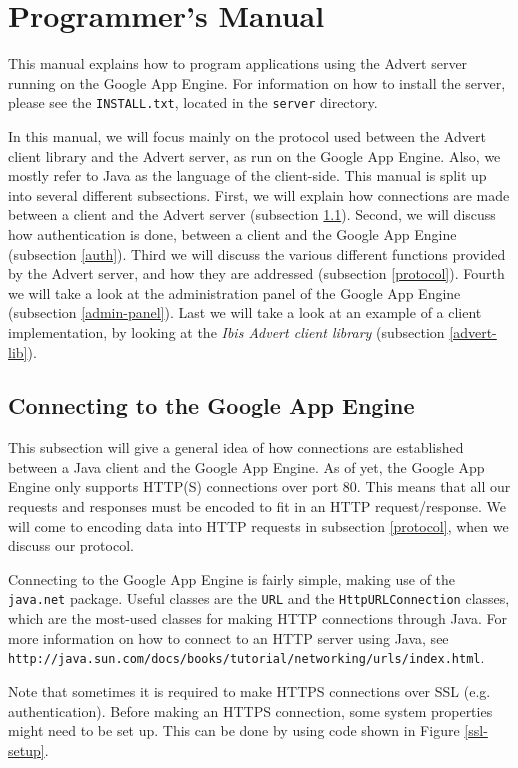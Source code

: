 \section{Programmer's Manual}
\label{progman}
This manual explains how to program applications using the Advert server running
on the Google App Engine. For information on how to install the server, please
see the \texttt{INSTALL.txt}, located in the \texttt{server} directory.

In this manual, we will focus mainly on the protocol used between the Advert
client library and the Advert server, as run on the Google App Engine. Also, we
mostly refer to Java as the language of the client-side. This manual is split up into
several different subsections. First, we will explain how connections are made
between a client and the Advert server (subsection \ref{http-java}). Second, we
will
discuss how authentication is done, between a client and the Google App Engine
(subsection \ref{auth}). Third we will discuss the various different functions
provided by the Advert server, and how they are addressed (subsection
\ref{protocol}). Fourth we will take a look at the administration panel of the
Google App Engine (subsection \ref{admin-panel}). Last we will take a look at an
example of a client implementation, by looking at the \emph{Ibis Advert
client library} (subsection \ref{advert-lib}).

\subsection{Connecting to the Google App Engine}
\label{http-java}
This subsection will give a general idea of how connections are established
between a Java client and the Google App Engine. As of yet, the Google App
Engine only supports HTTP(S) connections over port 80. This means that all our
requests and responses must be encoded to fit in an HTTP request/response. We
will come to encoding data into HTTP requests in subsection \ref{protocol}, when
we discuss our protocol.

Connecting to the Google App Engine is fairly simple, making use of the
\texttt{java.net} package. Useful classes are the \texttt{URL} and the
\texttt{HttpURLConnection} classes, which are the most-used classes for making
HTTP connections through Java. For more information on how to connect to an
HTTP server using Java, see
\texttt{http://java.sun.com/docs/books/tutorial/networking/urls/index.html}.

Note that sometimes it is required to make HTTPS connections over SSL
(e.g. authentication). Before making an HTTPS connection, some system
properties might need to be set up. This can be done by using code shown in
Figure \ref{ssl-setup}.

